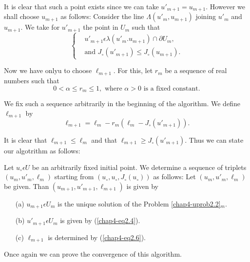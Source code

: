 It is clear that such a point exists since we can take $u'_{m+1} = u_{m+1}$. However we shall choose $u_{m+1}$ as follows: Consider the line $\Lambda (u'_{m}, u_{m+1})$ joining $u'_{m}$ and $u_{m+1}$. We take for $u'_{m+1}$ the point in $U_{m}$ such that
\begin{equation*}
\begin{cases}
& u'_{m+1} \epsilon \lambda (u'_{m}. u_{m+1}) \cap \partial U_{m},\\
& \text{and } J_{\circ} (u'_{m+1}) \leq J_{\circ} (u_{m+1}).\tag{2.4}\label{chap4-eq2.4}
\end{cases}
\end{equation*}\pageoriginale

Now we have onlyu to choose $\ell_{m+1}$. For this, let $r_{m}$ be a sequence of real numbers such that
\begin{equation*}
0 < \alpha \leq r_{m} \leq 1, \text{ where } \alpha > 0 \text{ is a fixed constant.}\tag{2.5}\label{chap4-eq2.5}
\end{equation*}

We fix such a sequence arbitrarily in the beginning of the algorithm. We define $\ell_{m+1}$ by
\begin{equation*}
\ell_{m+1} = \ell_{m} - r_{m} (\ell_{m} - J_{\circ} (u'_{m+1})).\tag{2.6}\label{chap4-eq2.6}
\end{equation*}

It is clear that $\ell_{m+1} \leq \ell_{m}$ and that $\ell_{m+1} \geq J_{\circ} (u'_{m+1})$. Thus we can state our algotrithm as follows:

\medskip
{} Let $u_{\circ} \epsilon U$ be an arbitrarily fixed initial point. We determine a sequence of triplets $(u_{m}, u'_{m}, \ell_{m})$ starting from $(u_{\circ}, u_{\circ}, J_{\circ}(u_{\circ}))$ as follows: Let $(u_{m}, u'_{m}, \ell_{m})$ be given. Than $(u_{m+1}, u'_{m+1}, \ell_{m+1})$ is given by
\begin{enumerate}
\item[(a)] $u_{m+1} \epsilon U_{m}$ is the unique solution of the Problem \ref{chap4-uprob2.2}$_{m}$.

\item[(b)] $u'_{m+1} \epsilon U_{m}$ is given by (\ref{chap4-eq2.4}).

\item[(c)] $\ell_{m+1}$ is determined by (\ref{chap4-eq2.6}).
\end{enumerate}

Once again we can prove the convergence of this algorithm.

